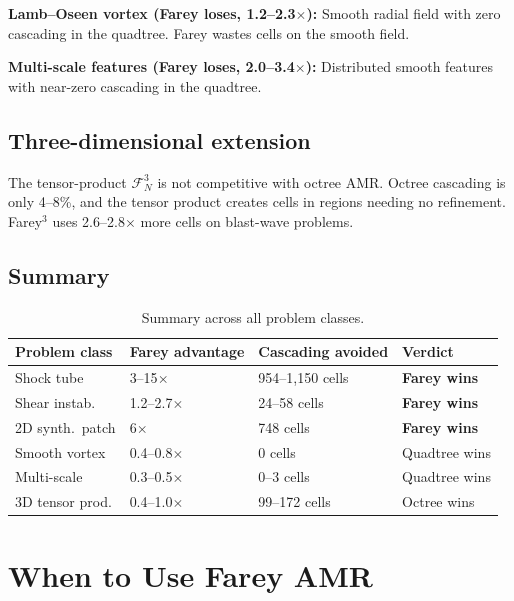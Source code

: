 \documentclass[11pt]{article}
\theoremstyle{definition}
\newcommand{\F}{\mathcal{F}}
\begin{document}
\textbf{Lamb--Oseen vortex (Farey loses, 1.2--2.3$\times$):} Smooth
radial field with zero cascading in the quadtree. Farey wastes cells
on the smooth field.

\textbf{Multi-scale features (Farey loses, 2.0--3.4$\times$):}
Distributed smooth features with near-zero cascading in the quadtree.

\subsection{Three-dimensional extension}

The tensor-product $\F_N^3$ is not competitive with octree AMR.
Octree cascading is only 4--8\%, and the tensor product creates
cells in regions needing no refinement. Farey$^3$ uses
2.6--2.8$\times$ more cells on blast-wave problems.

\subsection{Summary}

\begin{table}[ht]
\centering
\caption{Summary across all problem classes.}
\label{tab:summary}
\begin{tabular}{llll}
\toprule
Problem class & Farey advantage & Cascading avoided & Verdict \\
\midrule
Shock tube      & 3--15$\times$ & 954--1,150 cells &
  \textbf{Farey wins} \\
Shear instab.   & 1.2--2.7$\times$ & 24--58 cells &
  \textbf{Farey wins} \\
2D synth.\ patch & 6$\times$ & 748 cells &
  \textbf{Farey wins} \\
Smooth vortex   & 0.4--0.8$\times$ & 0 cells &
  Quadtree wins \\
Multi-scale     & 0.3--0.5$\times$ & 0--3 cells &
  Quadtree wins \\
3D tensor prod. & 0.4--1.0$\times$ & 99--172 cells &
  Octree wins \\
\bottomrule
\end{tabular}
\end{table}


\section{When to Use Farey AMR}\label{sec:decision}
\end{document}
